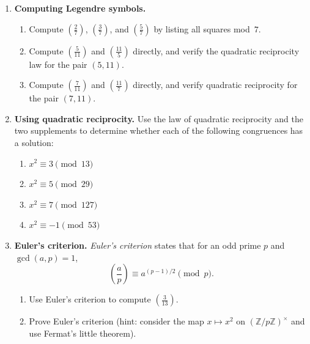 \begin{enumerate}
    \item \textbf{Computing Legendre symbols.}
    \begin{enumerate}
        \item Compute $\left(\frac{2}{7}\right)$, $\left(\frac{3}{7}\right)$, and $\left(\frac{5}{7}\right)$ by listing all squares mod~$7$.
        \item Compute $\left(\frac{5}{11}\right)$ and $\left(\frac{11}{5}\right)$ directly, and verify the quadratic reciprocity law for the pair $(5, 11)$.
        \item Compute $\left(\frac{7}{11}\right)$ and $\left(\frac{11}{7}\right)$ directly, and verify quadratic reciprocity for the pair $(7, 11)$.
    \end{enumerate}

    \item \textbf{Using quadratic reciprocity.} Use the law of quadratic reciprocity and the two supplements to determine whether each of the following congruences has a solution:
    \begin{enumerate}
        \item $x^2 \equiv 3 \pmod{13}$
        \item $x^2 \equiv 5 \pmod{29}$
        \item $x^2 \equiv 7 \pmod{127}$
        \item $x^2 \equiv -1 \pmod{53}$
    \end{enumerate}

    \item \textbf{Euler's criterion.} \emph{Euler's criterion} states that for an odd prime $p$ and $\gcd(a,p) = 1$,
    \[
        \left(\frac{a}{p}\right) \equiv a^{(p-1)/2} \pmod{p}.
    \]
    \begin{enumerate}
        \item Use Euler's criterion to compute $\left(\frac{3}{13}\right)$.
        \item Prove Euler's criterion (hint: consider the map $x \mapsto x^2$ on $(\mathbb{Z}/p\mathbb{Z})^\times$ and use Fermat's little theorem).
    \end{enumerate}


\end{enumerate}

